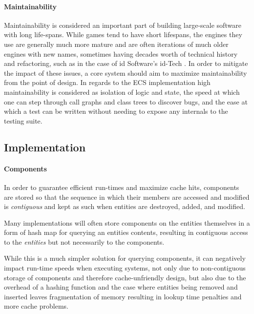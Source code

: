 \documentclass[10pt]{scrartcl}
\begin{document}

	\paragraph{Maintainability} %
	\label{par:maintainability}

	Maintainability is considered an important part of building large-scale software with long life-spans. While games tend to have short lifespans, the engines they use are generally much more mature and are often iterations of much older engines with new names, sometimes having decades worth of technical history and refactoring, such as in the case of id Software's id-Tech \parencite{id-tech}. In order to mitigate the impact of these issues, a core system should aim to maximize maintainability from the point of design. In regards to the ECS implementation high maintainability is considered as isolation of logic and state, the speed at which one can step through call graphs and class trees to discover bugs, and the ease at which a test can be written without needing to expose any internals to the testing suite.
	

	\subsection{Implementation} %
	\label{sub:implementation}

	\paragraph{Components} %
	\label{par:components}
	In order to guarantee efficient run-times and maximize cache hits, components are stored so that the sequence in which their members are accessed and modified is \textit{contiguous} and kept as such when entities are destroyed, added, and modified. 

	Many implementations will often store components on the entities themselves in a form of hash map for querying an entities contents, resulting in contiguous access to the \textit{entities} but not necessarily to the components. 

	While this is a much simpler solution for querying components, it can negatively impact run-time speeds when executing systems, not only due to non-contiguous storage of components and therefore cache-unfriendly design, but also due to the overhead of a hashing function and the case where entities being removed and inserted leaves fragmentation of memory resulting in lookup time penalties and more cache problems.
\end{document}
